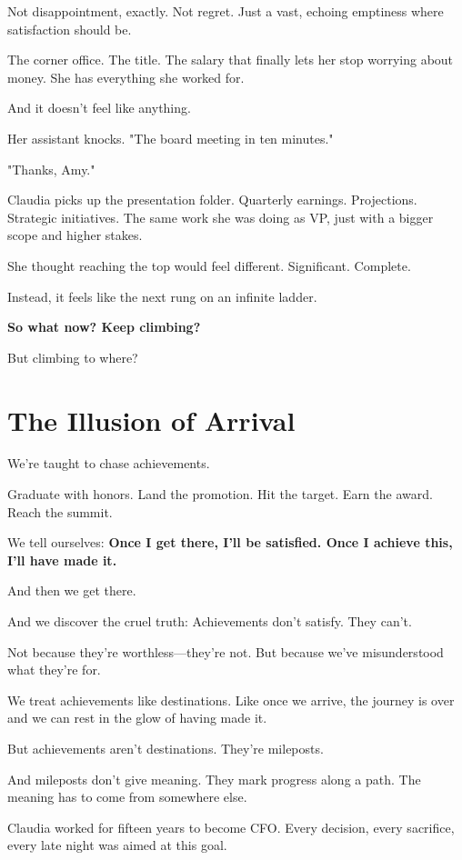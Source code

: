 \documentclass[11pt,twoside]{book}
\begin{document}
Not disappointment, exactly. Not regret. Just a vast, echoing emptiness where satisfaction should be.

The corner office. The title. The salary that finally lets her stop worrying about money. She has everything she worked for.

And it doesn't feel like anything.

Her assistant knocks. "The board meeting in ten minutes."

"Thanks, Amy."

Claudia picks up the presentation folder. Quarterly earnings. Projections. Strategic initiatives. The same work she was doing as VP, just with a bigger scope and higher stakes.

She thought reaching the top would feel different. Significant. Complete.

Instead, it feels like the next rung on an infinite ladder.

\textbf{So what now? Keep climbing?}

But climbing to where?

\section*{The Illusion of Arrival}

We're taught to chase achievements.

Graduate with honors. Land the promotion. Hit the target. Earn the award. Reach the summit.

We tell ourselves: \textbf{Once I get there, I'll be satisfied. Once I achieve this, I'll have made it.}

And then we get there.

And we discover the cruel truth: Achievements don't satisfy. They can't.

Not because they're worthless—they're not. But because we've misunderstood what they're for.

We treat achievements like destinations. Like once we arrive, the journey is over and we can rest in the glow of having made it.

But achievements aren't destinations. They're mileposts.

And mileposts don't give meaning. They mark progress along a path. The meaning has to come from somewhere else.

Claudia worked for fifteen years to become CFO. Every decision, every sacrifice, every late night was aimed at this goal.
\end{document}
